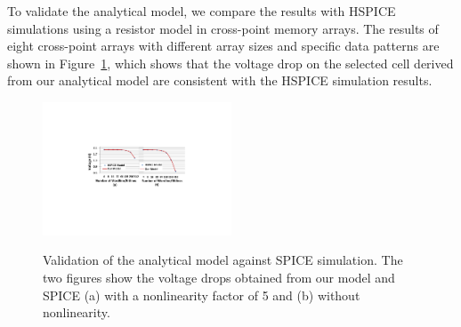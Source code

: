 To validate the analytical model, we compare the results with
HSPICE~\cite{HSPICE} simulations using a resistor model in cross-point
memory arrays. The results of eight cross-point arrays with different
array sizes and specific data patterns are shown in
Figure~\ref{fig:validation}, which shows that the voltage drop on the
selected cell derived from our analytical model are consistent with the
HSPICE simulation results.
\begin{figure}%
\centering\label{fig:SPICE}
  \includegraphics[width=0.5\textwidth]{./figures/SPICE1.pdf}\\    \vspace{-5pt}
  \caption{Validation of the analytical model against SPICE simulation. The two figures show the voltage drops obtained from our model and SPICE (a) with a nonlinearity factor of 5 and (b) without nonlinearity.}\label{fig:validation}
    \vspace{-10pt}
\end{figure}
%
